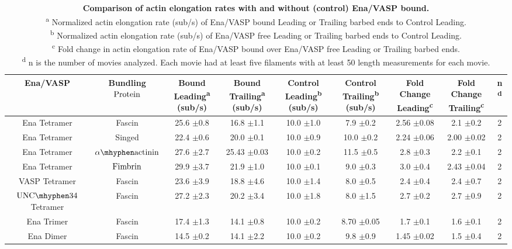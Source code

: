 \begin{table}[hbtp]
\centering 
\begin{tabulary}{1.0\textwidth}{C C C C C C C C C}
\toprule Ena\slash VASP & Bundling ${\textup{Protein}}$ & Bound Leading\textsuperscript{a} (sub/s) & Bound Trailing\textsuperscript{a} (sub/s) & Control Leading\textsuperscript{b} (sub/s) &  Control Trailing\textsuperscript{b} (sub/s)  &  Fold Change Leading\textsuperscript{c} & Fold Change Trailing\textsuperscript{c} & n\textsuperscript{d} \\ \midrule 
Ena Tetramer & Fascin & 25.6 $\pm$0.8 & 16.8 $\pm$1.1 & 10.0 $\pm$1.0 & 7.9 $\pm$0.2 & 2.56 $\pm$0.08 & 2.1 $\pm$0.2 & 2 \\ 
Ena Tetramer & Singed & 22.4 $\pm$0.6 & 20.0 $\pm$0.1 & 10.0 $\pm$0.9 & 10.0 $\pm$0.2 & 2.24 $\pm$0.06 & 2.00 $\pm$0.02 & 2 \\ 
Ena Tetramer & ${\alpha\mhyphen\textup{actinin}}$ & 27.6 $\pm$2.7 & 25.43 $\pm$0.03 & 10.0 $\pm$0.2 & 11.5 $\pm$0.5 & 2.8 $\pm$0.3 & 2.2 $\pm$0.1 & 2 \\
Ena Tetramer & ${\textup{Fimbrin}}$ & 29.9 $\pm$3.7 & 21.9 $\pm$1.0 & 10.0     $\pm$0.1 & 9.0 $\pm$0.3 & 3.0 $\pm$0.4 & 2.43 $\pm$0.04 & 2 \\
VASP Tetramer & Fascin & 23.6 $\pm$3.9 & 18.8 $\pm$4.6 & 10.0 $\pm$1.4 & 8.0 $\pm$0.5 & 2.4 $\pm$0.4 & 2.4 $\pm$0.7 & 2 \\
${\textup{UNC}\mhyphen34}$ Tetramer & Fascin & 27.2 $\pm$2.3 & 20.2 $\pm$3.4 & 10.0 $\pm$1.8 & 8.0 $\pm$1.5 & 2.7 $\pm$0.2 & 2.7 $\pm$0.9 & 2 \\
Ena Trimer & Fascin & 17.4 $\pm$1.3 & 14.1 $\pm$0.8 & 10.0 $\pm$0.2 & 8.70 $\pm$0.05 & 1.7 $\pm$0.1 & 1.6 $\pm$0.1 & 2 \\
Ena Dimer & Fascin & 14.5 $\pm$0.2 & 14.1 $\pm$2.2 & 10.0 $\pm$0.2 & 9.8 $\pm$0.9 & 1.45 $\pm$0.02 & 1.5 $\pm$0.4 & 2 \\
\bottomrule
\end{tabulary}
\caption[Comparison of actin elongation rates with and without (control) Ena/VASP bound.]{\textbf{Comparison of actin elongation rates with and without (control) Ena/VASP bound.} \\
   \textsuperscript{a} Normalized actin elongation rate (sub/s) of Ena/VASP bound Leading or Trailing barbed ends to Control Leading.\\
   \textsuperscript{b} Normalized actin elongation rate (sub/s) of Ena/VASP free Leading or Trailing barbed ends to Control Leading.\\
   \textsuperscript{c} Fold change in actin elongation rate of Ena/VASP bound over Ena/VASP free Leading or Trailing barbed ends.\\
   \textsuperscript{d} n is the number of movies analyzed. Each movie had at least five filaments with at least 50 length measurements for each movie.}
\label{tab:ena-elongation}
\end{table}

